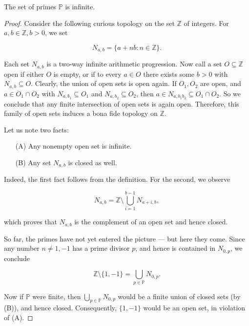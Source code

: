 \begin{theorem}
    \label{thm:fifth_proof}
    \leanok
    The set of primes \(\mathbb{P}\) is infinite.
\end{theorem}
\begin{proof}
    Consider the following curious topology on the set \(\mathbb{Z}\) of integers. For \(a, b \in \mathbb{Z}, b > 0\), we set

    \[
    N_{a,b} = \{a + nb : n \in \mathbb{Z}\}.
    \]

    Each set \(N_{a,b}\) is a two-way infinite arithmetic progression.
    Now call a set \(O \subseteq \mathbb{Z}\) open if either \(O\) is empty, or if to every \(a \in O\) there exists some \(b > 0\) with \(N_{a,b} \subseteq O\).
    Clearly, the union of open sets is open again. If \(O_1, O_2\) are open, and \(a \in O_1 \cap O_2\) with \(N_{a,b_1} \subseteq O_1\) and \(N_{a,b_2} \subseteq O_2\),
    then \(a \in N_{a, b_1 b_2} \subseteq O_1 \cap O_2\). So we conclude that any finite intersection of open sets is again open.
    Therefore, this family of open sets induces a bona fide topology on \(\mathbb{Z}\).

    Let us note two facts:

    \begin{itemize}
        \item[(A)] Any nonempty open set is infinite.
        \item[(B)] Any set \(N_{a,b}\) is closed as well.
    \end{itemize}

    Indeed, the first fact follows from the definition. For the second, we observe

    \[
    N_{a,b} = \mathbb{Z} \setminus \bigcup_{i=1}^{b-1} N_{a+i,b},
    \]

    which proves that \(N_{a,b}\) is the complement of an open set and hence closed.

    So far, the primes have not yet entered the picture — but here they come.
    Since any number \(n \neq 1, -1\) has a prime divisor \(p\), and hence is contained in \(N_{0,p}\), we conclude

    \[
    \mathbb{Z} \setminus \{1, -1\} = \bigcup_{p \in \mathbb{P}} N_{0,p}.
    \]

    Now if \(\mathbb{P}\) were finite, then \(\bigcup_{p \in \mathbb{P}} N_{0,p}\) would be a finite union of closed sets (by (B)), and hence closed.
    Consequently, \(\{1, -1\}\) would be an open set, in violation of (A).
\end{proof}

